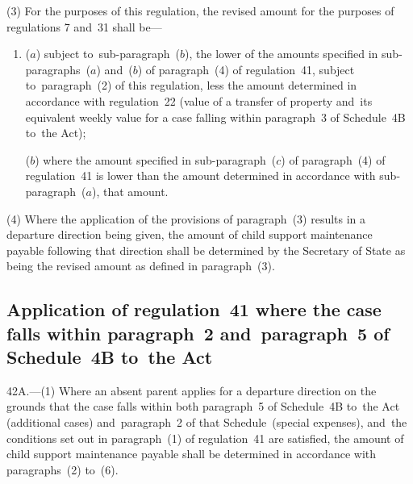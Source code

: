 \documentclass[12pt,a4paper]{article}
\begin{document}
(3) For the purposes of this regulation, the revised amount for the purposes of regulations 7 and~31 shall be—
\begin{enumerate}\item[]
($a$) subject to~sub-paragraph~($b$), the lower of the amounts specified in sub-paragraphs~($a$) and~($b$) of paragraph~(4) of regulation~41, subject to~paragraph~(2) of this regulation, less the amount determined in accordance with regulation~22 (value of a transfer of property and~its equivalent weekly value for a case falling within paragraph~3 of Schedule~4B to~the Act);

($b$) where the amount specified in sub-paragraph~($c$) of paragraph~(4) of regulation~41 is lower than the amount determined in accordance with sub-paragraph~($a$), that amount.
\end{enumerate}

(4) Where the application of the provisions of paragraph~(3) results in a departure direction being given, the amount of child support maintenance payable following that direction shall be 
determined by 
  the Secretary of State  %
as being  %
the revised amount as defined in paragraph~(3).


\subsection[42A. Application of regulation~41 where the case falls within paragraph~2 and~paragraph~5 of Schedule~4B to~the Act]{Application of regulation~41 where the case falls within paragraph~2 and~paragraph~5 of Schedule~4B to~the Act}

42A.—(1) Where an absent parent applies for a departure direction on the grounds that the case falls within both paragraph~5 of Schedule~4B to~the Act (additional cases) and~paragraph~2 of that Schedule~(special expenses), and~the conditions set out in paragraph~(1) of regulation~41 are satisfied, the amount of child support maintenance payable shall be determined in accordance with paragraphs~(2) to~(6).
\end{document}
